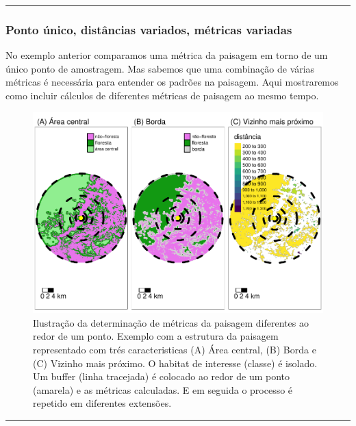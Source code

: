 \documentclass[
]{article}
\begin{document}
\begin{center}\rule{0.5\linewidth}{0.5pt}\end{center}

\newpage

\hypertarget{ponto-uxfanico-distuxe2ncias-variados-muxe9tricas-variadas}{%
\subsubsection{Ponto único, distâncias variados, métricas variadas}\label{ponto-uxfanico-distuxe2ncias-variados-muxe9tricas-variadas}}

No exemplo anterior comparamos uma métrica da paisagem em torno de um único ponto de amostragem. Mas sabemos que uma combinação de várias métricas é necessária para entender os padrões na paisagem.
Aqui mostraremos como incluir cálculos de diferentes métricas de paisagem ao mesmo tempo.

\begin{figure}
\centering
\includegraphics{epr_files/figure-latex/met-insert-fig-buffmetrics-1.pdf}
\caption{\label{fig:met-insert-fig-buffmetrics}Ilustração da determinação de métricas da paisagem diferentes ao redor de um ponto. Exemplo com a estrutura da paisagem representado com trés caracteristicas (A) Área central, (B) Borda e (C) Vizinho mais próximo. O habitat de interesse (classe) é isolado. Um buffer (linha tracejada) é colocado ao redor de um ponto (amarela) e as métricas calculadas. E em seguida o processo é repetido em diferentes extensões.}
\end{figure}

\begin{center}\rule{0.5\linewidth}{0.5pt}\end{center}
\end{document}
